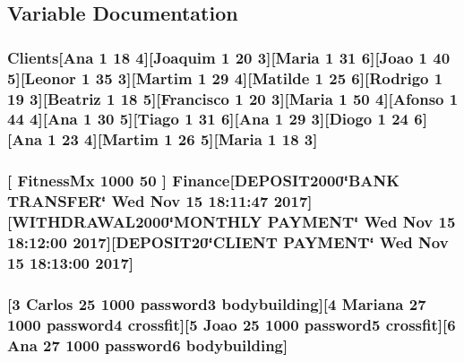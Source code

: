 \subsection{Variable Documentation}
\subsubsection[{\texorpdfstring{Clients}{Clients}}]{\setlength{\rightskip}{0pt plus 5cm}Clients\mbox{[}Ana 1 18 4\mbox{]}\mbox{[}Joaquim 1 20 3\mbox{]}\mbox{[}Maria 1 31 6\mbox{]}\mbox{[}Joao 1 40 5\mbox{]}\mbox{[}Leonor 1 35 3\mbox{]}\mbox{[}Martim 1 29 4\mbox{]}\mbox{[}Matilde 1 25 6\mbox{]}\mbox{[}Rodrigo 1 19 3\mbox{]}\mbox{[}Beatriz 1 18 5\mbox{]}\mbox{[}Francisco 1 20 3\mbox{]}\mbox{[}Maria 1 50 4\mbox{]}\mbox{[}Afonso 1 44 4\mbox{]}\mbox{[}Ana 1 30 5\mbox{]}\mbox{[}Tiago 1 31 6\mbox{]}\mbox{[}Ana 1 29 3\mbox{]}\mbox{[}Diogo 1 24 6\mbox{]}\mbox{[}Ana 1 23 4\mbox{]}\mbox{[}Martim 1 26 5\mbox{]}\mbox{[}Maria 1 18 3\mbox{]}}\hypertarget{outFile_8txt_ab53c6b8a41aeef0c40b64d3d2c428a6b}{}\label{outFile_8txt_ab53c6b8a41aeef0c40b64d3d2c428a6b}
\subsubsection[{\texorpdfstring{Finance}{Finance}}]{ \mbox{[} Fitness\+Mx 1000 50 \mbox{]} {\bf Finance}\mbox{[}D\+E\+P\+O\+S\+I\+T2000\char`\"{}B\+A\+NK T\+R\+A\+N\+S\+F\+ER\char`\"{} \textquotesingle{}Wed Nov 15 18\+:11\+:47 2017\textquotesingle{}\mbox{]}\mbox{[}W\+I\+T\+H\+D\+R\+A\+W\+A\+L2000\char`\"{}M\+O\+N\+T\+H\+LY P\+A\+Y\+M\+E\+NT\char`\"{} \textquotesingle{}Wed Nov 15 18\+:12\+:00 2017\textquotesingle{}\mbox{]}\mbox{[}D\+E\+P\+O\+S\+I\+T20\char`\"{}C\+L\+I\+E\+NT P\+A\+Y\+M\+E\+NT\char`\"{} \textquotesingle{}Wed Nov 15 18\+:13\+:00 2017\textquotesingle{}\mbox{]}}\hypertarget{outFile_8txt_a4d8a5d84ce8d74c2e12ef31b160e54b1}{}\label{outFile_8txt_a4d8a5d84ce8d74c2e12ef31b160e54b1}
\subsubsection[{\texorpdfstring{Personal\+Trainer}{PersonalTrainer}}]{\mbox{[}3 Carlos 25 1000 password3 bodybuilding\mbox{]}\mbox{[}4 Mariana 27 1000 password4 crossfit\mbox{]}\mbox{[}5 Joao 25 1000 password5 crossfit\mbox{]}\mbox{[}6 Ana 27 1000 password6 bodybuilding\mbox{]}}\hypertarget{outFile_8txt_a8aa9f45f51f1850059c6a3d9af92d5fd}{}\label{outFile_8txt_a8aa9f45f51f1850059c6a3d9af92d5fd}
